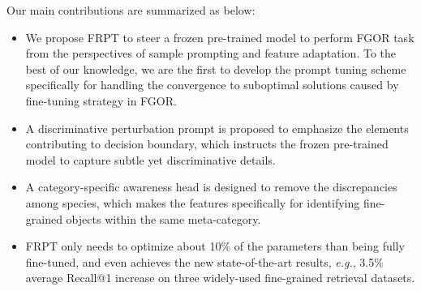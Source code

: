 \documentclass[letterpaper]{article} %
\begin{document}



Our main contributions are summarized as below:
\begin{itemize}
    \item  We propose FRPT to steer a frozen pre-trained model to perform FGOR task from the perspectives of sample prompting and feature adaptation. To the best of our knowledge, we are the first to develop the prompt tuning scheme specifically for handling the convergence to suboptimal solutions caused by fine-tuning strategy in FGOR.

 \item A discriminative perturbation prompt is proposed to emphasize the elements contributing to decision boundary, which instructs the frozen pre-trained model to capture subtle yet discriminative details.

\item A category-specific awareness head is designed to remove the discrepancies among species, which makes the features specifically for identifying fine-grained objects within the same meta-category.


\item FRPT only needs to optimize about 10\% of the parameters than being fully fine-tuned, and even achieves the new state-of-the-art results, {\it e.g.}, 3.5\% average Recall@1 increase on three widely-used fine-grained retrieval datasets. 
\end{itemize}

\end{document}
